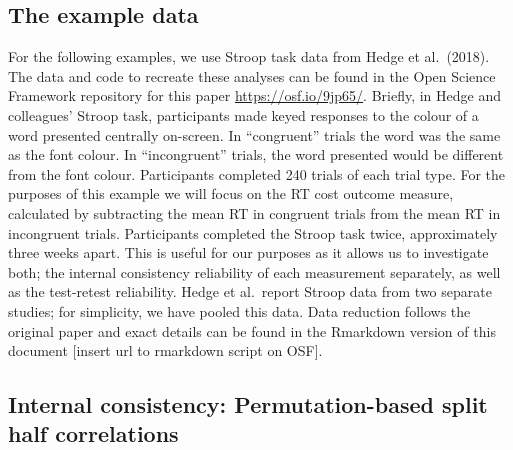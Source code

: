 \documentclass[english,,man,floatsintext]{apa6}
\begin{document}
\hypertarget{the-example-data}{%
\subsection{The example data}\label{the-example-data}}

For the following examples, we use Stroop task data from Hedge et al.~(2018). The data and code to recreate these analyses can be found in the Open Science Framework repository for this paper \url{https://osf.io/9jp65/}. Briefly, in Hedge and colleagues' Stroop task, participants made keyed responses to the colour of a word presented centrally on-screen. In \enquote{congruent} trials the word was the same as the font colour. In \enquote{incongruent} trials, the word presented would be different from the font colour. Participants completed 240 trials of each trial type. For the purposes of this example we will focus on the RT cost outcome measure, calculated by subtracting the mean RT in congruent trials from the mean RT in incongruent trials. Participants completed the Stroop task twice, approximately three weeks apart. This is useful for our purposes as it allows us to investigate both; the internal consistency reliability of each measurement separately, as well as the test-retest reliability. Hedge et al.~report Stroop data from two separate studies; for simplicity, we have pooled this data. Data reduction follows the original paper and exact details can be found in the Rmarkdown version of this document {[}insert url to rmarkdown script on OSF{]}.

\hypertarget{internal-consistency-permutation-based-split-half-correlations}{%
\subsection{Internal consistency: Permutation-based split half correlations}\label{internal-consistency-permutation-based-split-half-correlations}}
\end{document}

